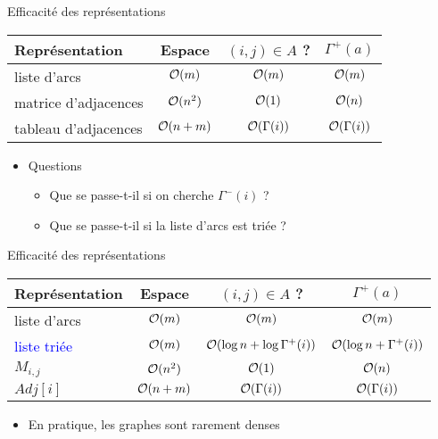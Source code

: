 \begin{frame}{Efficacité des représentations}
    \begin{center}
        \begin{tabular}{|l|c|c|c|}
            \hline
            Représentation & Espace & $(i,j)\in A$ ? & $\Gamma^+(a)$ \\
            \hline
            liste d'arcs & ${\cal O}(m)$ & ${\cal O}(m)$ & ${\cal O}(m)$ \\
            \hline
            matrice d'adjacences & ${\cal O}(n^2)$ & ${\cal O}(1)$ & ${\cal O}(n)$  \\
            \hline  
            tableau d'adjacences & ${\cal O}(n+m)$ & ${\cal O}(\Gamma(i))$ &  ${\cal O}(\Gamma(i))$ \\ 
            \hline
        \end{tabular}
    \end{center}

    \begin{itemize}
        \item Questions
        \begin{itemize}
            \item Que se passe-t-il si on cherche $\Gamma^-(i)$ ?
            \item Que se passe-t-il si la liste d'arcs est triée ?
        \end{itemize}
    \end{itemize}
\end{frame}

\begin{frame}{Efficacité des représentations}
    \begin{center}
        \begin{tabular}{|l|c|c|c|}
            \hline
            Représentation & Espace & $(i,j)\in A$ ? & $\Gamma^+(a)$ \\
            \hline
            liste d'arcs & ${\cal O}(m)$ & ${\cal O}(m)$ & ${\cal O}(m)$ \\
            \hline 
            \textcolor{blue}{liste triée} & ${\cal O}(m)$ & ${\cal O}(\log n + \log \Gamma^+(i))$ & ${\cal O}(\log n + \Gamma^+(i))$ \\
            \hline
            $M_{i,j}$ & ${\cal O}(n^2)$ & ${\cal O}(1)$ & ${\cal O}(n)$  \\
            \hline  
            $Adj[i]$ & ${\cal O}(n+m)$ & ${\cal O}(\Gamma(i))$ &  ${\cal O}(\Gamma(i))$ \\ 
            \hline
        \end{tabular}
    \end{center}

    \begin{itemize}
        \item En pratique, les graphes sont rarement denses 
    \end{itemize}
\end{frame}


